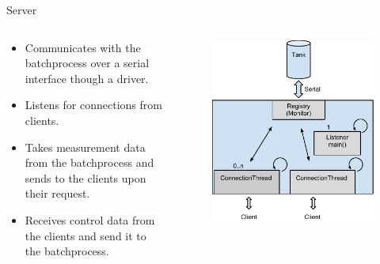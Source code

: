 \documentclass{beamer}
\begin{document}
\begin{frame}{Server}
\begin{columns}[T]
    \begin{column}{.55\textwidth}
        \begin{itemize}
            \item Communicates with the batchprocess over a serial interface though a driver.
            \item Listens for connections from clients.
            \item Takes measurement data from the batchprocess and sends to the clients upon their request.
            \item Receives control data from the clients and send it to the batchprocess.
        \end{itemize}
    \end{column}
    \begin{column}{.45\textwidth}

        \begin{figure}[H]
           \centering
         \includegraphics[width=1\textwidth]{server_sketch.pdf}
        \end{figure}

    \end{column}
\end{columns}
\end{frame}
\end{document}
